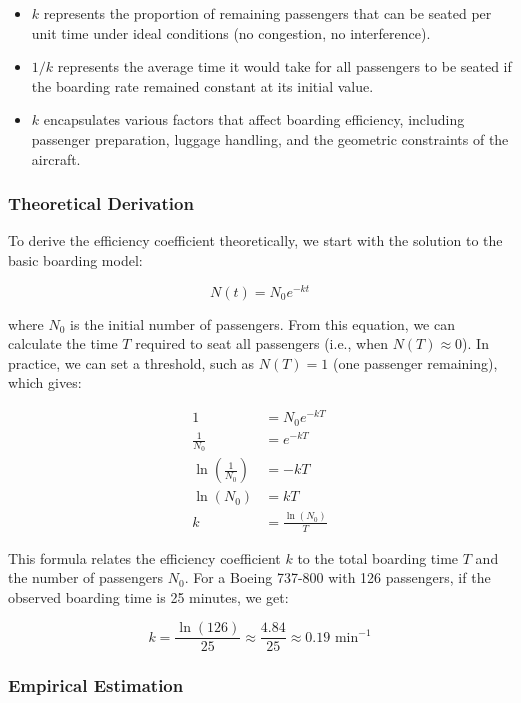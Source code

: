 \documentclass[12pt,a4paper]{article}
\begin{document}
\begin{itemize}
    \item $k$ represents the proportion of remaining passengers that can be seated per unit time under ideal conditions (no congestion, no interference).
    \item $1/k$ represents the average time it would take for all passengers to be seated if the boarding rate remained constant at its initial value.
    \item $k$ encapsulates various factors that affect boarding efficiency, including passenger preparation, luggage handling, and the geometric constraints of the aircraft.
\end{itemize}

\subsubsection{Theoretical Derivation}

To derive the efficiency coefficient theoretically, we start with the solution to the basic boarding model:

\begin{equation}
N(t) = N_0 e^{-kt}
\end{equation}

where $N_0$ is the initial number of passengers. From this equation, we can calculate the time $T$ required to seat all passengers (i.e., when $N(T) \approx 0$). In practice, we can set a threshold, such as $N(T) = 1$ (one passenger remaining), which gives:

\begin{align}
1 &= N_0 e^{-kT} \\
\frac{1}{N_0} &= e^{-kT} \\
\ln\left(\frac{1}{N_0}\right) &= -kT \\
\ln(N_0) &= kT \\
k &= \frac{\ln(N_0)}{T}
\end{align}

This formula relates the efficiency coefficient $k$ to the total boarding time $T$ and the number of passengers $N_0$. For a Boeing 737-800 with 126 passengers, if the observed boarding time is 25 minutes, we get:

\begin{equation}
k = \frac{\ln(126)}{25} \approx \frac{4.84}{25} \approx 0.19 \text{ min}^{-1}
\end{equation}

\subsubsection{Empirical Estimation}
\end{document}
